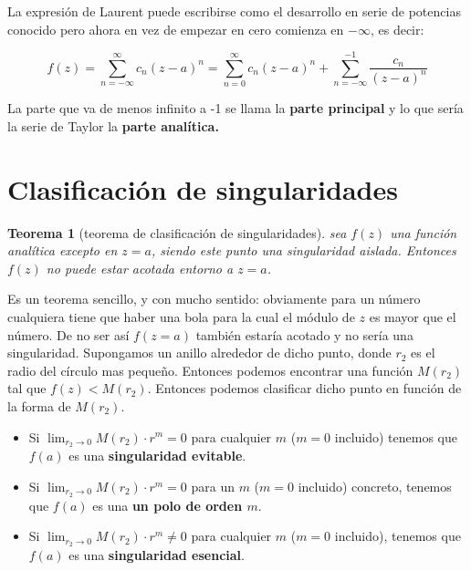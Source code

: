 \documentclass[12pt,a4paper]{book}
\newtheorem{theorem}{Teorema}[section]
\begin{document}
La expresión de Laurent puede escribirse como el desarrollo en serie de potencias conocido pero ahora en vez de empezar en cero comienza en $-\infty$, es decir:

\begin{equation}
f(z) = \sum_{n=-\infty}^{\infty} c_n (z-a)^n = \sum_{n=0}^{\infty} c_n (z-a)^n + \sum_{n=-\infty}^{-1} \frac{c_{n}}{(z-a)^n}
\end{equation}

La parte que va de menos infinito a -1 se llama la \textbf{parte principal} y lo que sería la serie de Taylor la \textbf{parte analítica.}

\section{Clasificación de singularidades}

\begin{theorem}[teorema de clasificación de singularidades]
sea $f(z)$ una función analítica excepto en $z=a$, siendo este punto una singularidad aislada. Entonces $f(z)$ no puede estar acotada entorno a $z=a$. 
\end{theorem}

Es un teorema sencillo, y con mucho sentido: obviamente para un número cualquiera tiene que haber una bola para la cual el módulo de $z$ es mayor que el número. De no ser así $f(z=a)$ también estaría acotado y no sería una singularidad. Supongamos un anillo alrededor de dicho punto, donde $r_2$ es el radio del círculo mas pequeño. Entonces podemos encontrar una función $M(r_2)$ tal que $f(z) < M(r_2)$. Entonces podemos clasificar dicho punto en función de la forma de $M(r_2)$.

\begin{itemize}
\item Si $\lim_{r_2 \rightarrow 0} M(r_2) \cdot r^m  = 0$ para cualquier $m$ ($m=0$ incluido) tenemos que $f(a)$ es una \textbf{singularidad evitable}. 

\item Si $\lim_{r_2 \rightarrow 0} M(r_2) \cdot r^m  = 0$ para un $m$ ($m=0$ incluido) concreto, tenemos que $f(a)$ es una \textbf{un polo de orden $m$}.



\item Si $\lim_{r_2 \rightarrow 0} M(r_2) \cdot r^m  \neq 0$ para cualquier $m$ ($m=0$ incluido), tenemos que $f(a)$ es una \textbf{singularidad esencial}.
\end{itemize}
\end{document}
